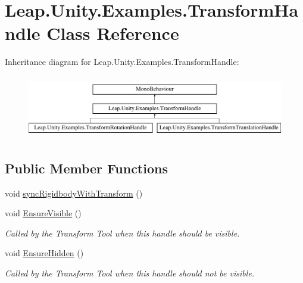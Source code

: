 \hypertarget{class_leap_1_1_unity_1_1_examples_1_1_transform_handle}{}\section{Leap.\+Unity.\+Examples.\+Transform\+Handle Class Reference}
\label{class_leap_1_1_unity_1_1_examples_1_1_transform_handle}
Inheritance diagram for Leap.\+Unity.\+Examples.\+Transform\+Handle\+:\begin{figure}[H]
\begin{center}
\leavevmode
\includegraphics[height=2.800000cm]{class_leap_1_1_unity_1_1_examples_1_1_transform_handle}
\end{center}
\end{figure}
\subsection*{Public Member Functions}
\begin{DoxyCompactItemize}
\item 
void \mbox{\hyperlink{class_leap_1_1_unity_1_1_examples_1_1_transform_handle_a4f3a9141f2596e224e0cefcfe2e83625}{sync\+Rigidbody\+With\+Transform}} ()
\item 
void \mbox{\hyperlink{class_leap_1_1_unity_1_1_examples_1_1_transform_handle_a7a05bc45924b44e7700a1388a7ff1eaf}{Ensure\+Visible}} ()
\begin{DoxyCompactList}\small\item\em Called by the Transform Tool when this handle should be visible. \end{DoxyCompactList}\item 
void \mbox{\hyperlink{class_leap_1_1_unity_1_1_examples_1_1_transform_handle_a0b4f4c6eacf1086b9903ced1eed8a6ce}{Ensure\+Hidden}} ()
\begin{DoxyCompactList}\small\item\em Called by the Transform Tool when this handle should not be visible. \end{DoxyCompactList}\end{DoxyCompactItemize}

